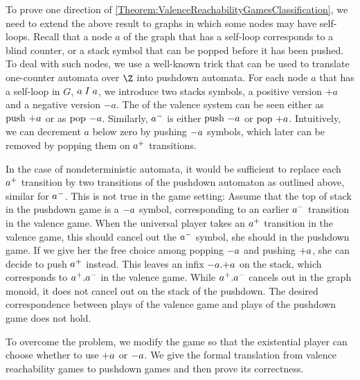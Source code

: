 \documentclass[../../diss.tex]{subfiles}
\begin{document}
To prove one direction of \cref{Theorem:ValenceReachabilityGamesClassification}, we need to extend the above result to graphs in which some nodes may have self-loops.
Recall that a node $a$ of the graph that has a self-loop corresponds to a blind counter, or a stack symbol that can be popped before it has been pushed.
To deal with such nodes, we use a well-known trick that can be used to translate one-counter automata over $\Z$ into pushdown automata.
For each node $a$ that has a self-loop in $G$, $a \mathrel{I} a$, we introduce two stacks symbols, a positive version $+a$ and a negative version $-a$.
The  of the valence system can be seen either as $\pushop \plusop{a}$ or as $\popop \minusop{a}$.
Similarly, ${a}^-$ is either $\pushop \minusop{a}$ or $\popop \plusop{a}$.
Intuitively, we can decrement $a$ below zero by pushing $\minusop{a}$ symbols, which later can be removed by popping them on ${a}^+$ transitions.

In the case of nondeterministic automata, it would be sufficient to replace each ${a}^+$ transition by two transitions of the pushdown automaton as outlined above, similar for ${a}^-$.
This is not true in the game setting:
Assume that the top of stack in the pushdown game is a $\minusop{a}$ symbol, corresponding to an earlier ${a}^-$ transition in the valence game.
When the universal player takes an ${a}^+$ transition in the valence game, this should cancel out the ${a}^-$ symbol, \ie she should  in the pushdown game.
If we give her the free choice among popping $\minusop{a}$ and pushing $\plusop{a}$, she can decide to push ${a}^+$ instead.
This leaves an infix $\minusop{a}.\plusop{a}$ on the stack, which corresponds to ${a}^+.{a}^-$ in the valence game.
While ${a}^+.{a}^-$ cancels out in the graph monoid, it does not cancel out on the stack of the pushdown.
The desired correspondence between plays of the valence game and plays of the pushdown game does not hold.

To overcome the problem, we modify the game so that the existential player can choose whether to use $\plusop{a}$ or $\minusop{a}$.
We give the formal translation from valence reachability games to pushdown games and then prove its correctness.
\end{document}
